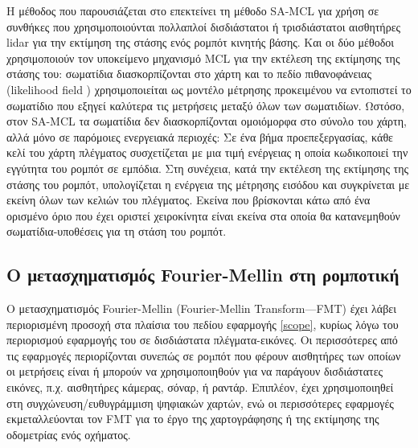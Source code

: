 Η μέθοδος που παρουσιάζεται στο \cite{Yilmaz2019} επεκτείνει τη μέθοδο SA-MCL
\cite{Zhang2009} για χρήση σε συνθήκες που χρησιμοποιούνται πολλαπλοί
δισδιάστατοι ή τρισδιάστατοι αισθητήρες lidar για την εκτίμηση της στάσης ενός
ρομπότ κινητής βάσης. Και οι δύο μέθοδοι χρησιμοποιούν τον υποκείμενο μηχανισμό
MCL \cite{Gustafsson2002} για την εκτέλεση της εκτίμησης της στάσης του:
σωματίδια διασκορπίζονται στο χάρτη και το πεδίο πιθανοφάνειας (likelihood
field \cite{thrun2005probabilistic}) χρησιμοποιείται ως μοντέλο μέτρησης
προκειμένου να εντοπιστεί το σωματίδιο που εξηγεί καλύτερα τις μετρήσεις μεταξύ
όλων των σωματιδίων. Ωστόσο, στον SA-MCL τα σωματίδια δεν διασκορπίζονται
ομοιόμορφα στο σύνολο του χάρτη, αλλά μόνο σε παρόμοιες ενεργειακά περιοχές: Σε
ένα βήμα προεπεξεργασίας, κάθε κελί του χάρτη πλέγματος συσχετίζεται με μια
τιμή ενέργειας η οποία κωδικοποιεί την εγγύτητα του ρομπότ σε εμπόδια. Στη
συνέχεια, κατά την εκτέλεση της εκτίμησης της στάσης του ρομπότ, υπολογίζεται η
ενέργεια της μέτρησης εισόδου και συγκρίνεται με εκείνη όλων των κελιών του
πλέγματος.  Εκείνα που βρίσκονται κάτω από ένα ορισμένο όριο που έχει οριστεί
χειροκίνητα είναι εκείνα στα οποία θα κατανεμηθούν σωματίδια-υποθέσεις για τη
στάση του ρομπότ.



\subsection{Ο μετασχηματισμός Fourier-Mellin στη ρομποτική}
\label{subsection:02_03_02:02}

Ο μετασχηματισμός Fourier-Mellin (Fourier-Mellin Transform---FMT) έχει λάβει
περιορισμένη προσοχή στα πλαίσια του πεδίου εφαρμογής \ref{scope}, κυρίως λόγω
του περιορισμού εφαρμογής του σε δισδιάστατα πλέγματα-εικόνες. Οι περισσότερες
από τις εφαρµογές περιορίζονται συνεπώς σε ροµπότ που φέρουν αισθητήρες των
οποίων οι μετρήσεις είναι ή μπορούν να χρησιμοποιηθούν για να παράγουν
δισδιάστατες εικόνες, π.χ. αισθητήρες κάμερας, σόναρ, ή ραντάρ.  Επιπλέον, έχει
χρησιμοποιηθεί στη συγχώνευση/ευθυγράμμιση ψηφιακών χαρτών, ενώ οι περισσότερες
εφαρμογές εκμεταλλεύονται τον FMT για το έργο της χαρτογράφησης ή της εκτίμησης
της οδομετρίας ενός οχήματος.

